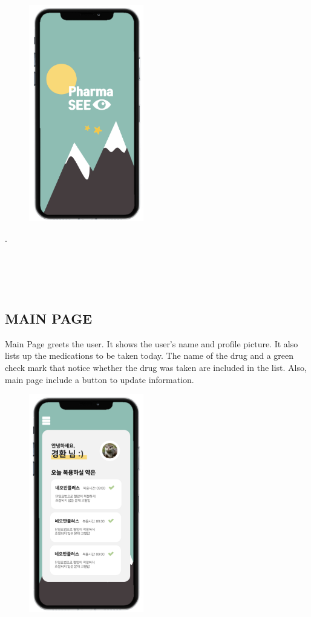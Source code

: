 \documentclass[conference]{IEEEtran}
\begin{document}
\begin{figure}[h!]
\centering
\includegraphics[width=5cm]{imagefolder/loadingui.png}
\caption{}
\label{fig:map}
\end{figure}
.\\
\\
\\
\\
\\

\subsection{MAIN PAGE}
Main Page greets the user. It shows the user's name and profile picture. It also lists up the medications to be taken today. The name of the drug and a green check mark that notice whether the drug was taken are included in the list. Also, main page include a button to update information. \\

\begin{figure}[h!]
\centering
\includegraphics[width=5cm]{final_image_folder/mypage.png}
\caption{}
\label{fig:map}
\end{figure}
\end{document}
